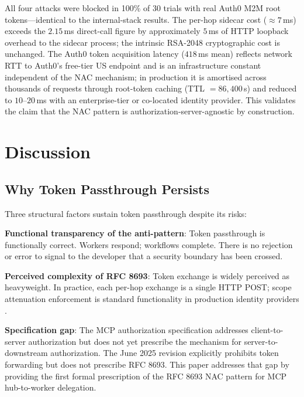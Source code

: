 \documentclass[journal]{IEEEtran}
\begin{document}
All four attacks were blocked in 100\% of 30 trials with real Auth0 M2M root
tokens---identical to the internal-stack results. The per-hop sidecar cost
($\approx 7$\,ms) exceeds the $2.15$\,ms direct-call figure by approximately
$5$\,ms of HTTP loopback overhead to the sidecar process; the intrinsic
RSA-2048 cryptographic cost is unchanged. The Auth0 token acquisition latency
($418$\,ms mean) reflects network RTT to Auth0's free-tier US endpoint and is
an infrastructure constant independent of the NAC mechanism; in production it is
amortised across thousands of requests through root-token caching (TTL
$=86{,}400$\,s) and reduced to $10$--$20$\,ms with an enterprise-tier or
co-located identity provider. This validates the claim that the NAC pattern is
authorization-server-agnostic by construction.

\section{Discussion}
\label{sec:discussion}

\subsection{Why Token Passthrough Persists}

Three structural factors sustain token passthrough despite its risks:

\textbf{Functional transparency of the anti-pattern}: Token passthrough is
functionally correct. Workers respond; workflows complete. There is no rejection
or error to signal to the developer that a security boundary has been crossed.

\textbf{Perceived complexity of RFC 8693}: Token exchange is widely perceived
as heavyweight. In practice, each per-hop exchange is a single HTTP POST;
scope attenuation enforcement is standard functionality in production identity
providers \cite{rfc8693_deploy}.

\textbf{Specification gap}: The MCP authorization specification
\cite{mcp_spec_2025} addresses client-to-server authorization but does not yet
prescribe the mechanism for server-to-downstream authorization. The June 2025
revision explicitly prohibits token forwarding but does not prescribe RFC 8693.
This paper addresses that gap by providing the first formal prescription of the
RFC 8693 NAC pattern for MCP hub-to-worker delegation.
\end{document}
